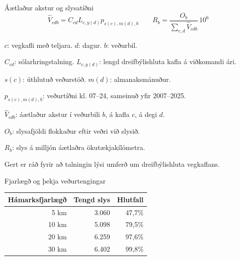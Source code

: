 \documentclass[aspectratio=169,12pt,t]{beamer}
\begin{document}
\begin{frame}{Áætlaður akstur og slysatíðni}
\relax
\setlength{\parskip}{2pt}
\relax
\[
 \widehat V_{cdb}=C_{cd}L_{c,y(d)}p_{s(c),m(d),b}
 \qquad
 R_b=\frac{O_b}{\sum_{c,d}\widehat V_{cdb}}\,10^6
\]
\par\vspace{1mm}
{\small
$c$: vegkafli með teljara. $d$: dagur. $b$: veðurbil.\par
$C_{cd}$: sólarhringstalning. $L_{c,y(d)}$: lengd dreifbýlishluta kafla á viðkomandi ári.\par
$s(c)$: úthlutuð veðurstöð. $m(d)$: almanaksmánuður.\par
$p_{s(c),m(d),b}$: veðurtíðni kl. 07--24, sameinuð yfir 2007--2025.\par
$\widehat V_{cdb}$: áætlaður akstur í veðurbili $b$, á kafla $c$, á degi $d$.\par
$O_b$: slysafjöldi flokkaður eftir veðri við slysið.\par
$R_b$: slys á milljón áætlaðra ökutækjakílómetra.\par}
{\footnotesize Gert er ráð fyrir að talningin lýsi umferð um dreifbýlishluta vegkaflans.\par}
\end{frame}

\begin{frame}{Fjarlægð og þekja veðurtengingar}
\relax
{\centering\renewcommand{\arraystretch}{1.4}
\begin{tabular}{@{}rrr@{}}\toprule
Hámarksfjarlægð & Tengd slys & Hlutfall\\\midrule
5 km & 3.060 & 47,7\%\\
10 km & 5.098 & 79,5\%\\
20 km & 6.259 & 97,6\%\\
30 km & 6.402 & 99,8\%\\\bottomrule
\end{tabular}\par}
\end{frame}
\end{document}
